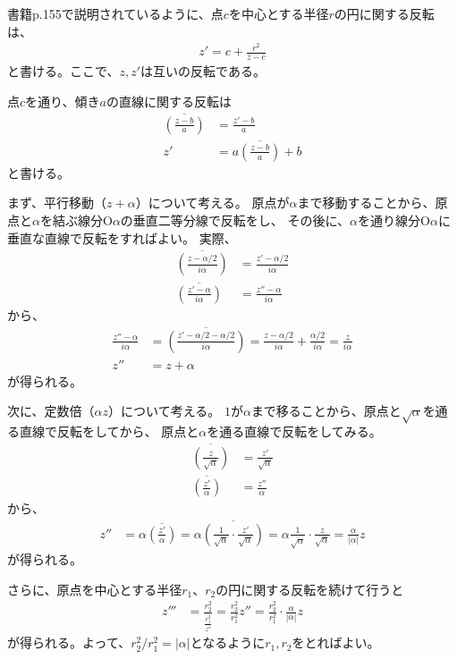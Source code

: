 書籍p.155で説明されているように、点$c$を中心とする半径$r$の円に関する反転は、
\begin{align*}
    z'=c+\frac{r^2}{\overline{z}-\overline{c}}
\end{align*}
と書ける。ここで、$z,z'$は互いの反転である。

点$c$を通り、傾き$a$の直線に関する反転は
\begin{align*}
    \overline{\left(\frac{z-b}{a}\right)}
    &=\frac{z'-b}{a}\\
    z'&=a\overline{\left(\frac{z-b}{a}\right)}+b
\end{align*}
と書ける。

まず、平行移動（$z+\alpha$）について考える。
原点が$\alpha$まで移動することから、原点と$\alpha$を結ぶ線分$\mathrm{O}\alpha$の垂直二等分線で反転をし、
その後に、$\alpha$を通り線分$\mathrm{O}\alpha$に垂直な直線で反転をすればよい。
実際、
\begin{align*}
    \overline{\left(\frac{z-\alpha/2}{i\alpha}\right)}
    &=\frac{z'-\alpha/2}{i\alpha}\\
    \overline{\left(\frac{z'-\alpha}{i\alpha}\right)}
    &=\frac{z''-\alpha}{i\alpha}
\end{align*}
から、
\begin{align*}
    \frac{z''-\alpha}{i\alpha}
    &=\overline{\left(\frac{z'-\alpha/2-\alpha/2}{i\alpha}\right)}
    =\frac{z-\alpha/2}{i\alpha}+\frac{\alpha/2}{i\alpha}
    =\frac{z}{i\alpha}\\
    z''&=z+\alpha
\end{align*}
が得られる。

次に、定数倍（$\alpha z$）について考える。
$1$が$\alpha$まで移ることから、原点と$\sqrt{\alpha}$を通る直線で反転をしてから、
原点と$\alpha$を通る直線で反転をしてみる。
\begin{align*}
    \overline{\left(\frac{z}{\sqrt{\alpha}}\right)}
    &=\frac{z'}{\sqrt{\alpha}}\\
    \overline{\left(\frac{z'}{\alpha}\right)}
    &=\frac{z''}{\alpha}
\end{align*}
から、
\begin{align*}
    z''&=\alpha\overline{\left(\frac{z'}{\alpha}\right)}
    =\alpha\overline{\left(\frac{1}{\sqrt{\alpha}}\cdot\frac{z'}{\sqrt{\alpha}}\right)}
    =\alpha\frac{1}{\overline{\sqrt{\alpha}}}\cdot\frac{z}{\sqrt{\alpha}}
    =\frac{\alpha}{|\alpha|}z
\end{align*}
が得られる。

さらに、原点を中心とする半径$r_1$、$r_2$の円に関する反転を続けて行うと
\begin{align*}
    z'''&=\frac{r_2^2}{\overline{\frac{r_1^2}{\overline{z''}}}}
    =\frac{r_2^2}{r_1^2}z''
    =\frac{r_2^2}{r_1^2}\cdot\frac{\alpha}{|\alpha|}z
\end{align*}
が得られる。よって、$r_2^2/r_1^2=|\alpha|$となるように$r_1,r_2$をとればよい。

